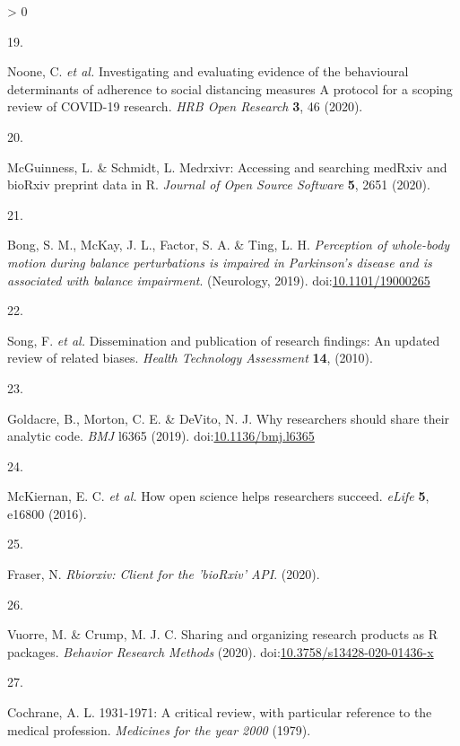 \documentclass[a4paper, twoside]{templates/ociamthesis}
\newlength{\cslhangindent}
\newlength{\csllabelwidth}
\newenvironment{CSLReferences}[3] %
 {%
  \setlength{\parindent}{0pt}
  \ifodd #1 \everypar{\setlength{\hangindent}{\cslhangindent}}\ignorespaces\fi
  \ifnum #2 > 0
  \setlength{\parskip}{#2\baselineskip}
  \fi
 }%
 {}
\newcommand{\CSLLeftMargin}[1]{\parbox[t]{\maxof{\widthof{#1}}{\csllabelwidth}}{#1}}
\newcommand{\CSLRightInline}[1]{\parbox[t]{\linewidth - \csllabelwidth}{#1}}
\begin{document}
\begin{CSLReferences}{0}{0}
\leavevmode\hypertarget{ref-noone2020}{}%
\CSLLeftMargin{19. }
\CSLRightInline{Noone, C. \emph{et al.} Investigating and evaluating evidence of the behavioural determinants of adherence to social distancing measures {} {A} protocol for a scoping review of {COVID}-19 research. \emph{HRB Open Research} \textbf{3}, 46 (2020).}

\leavevmode\hypertarget{ref-mcguinness2020a}{}%
\CSLLeftMargin{20. }
\CSLRightInline{McGuinness, L. \& Schmidt, L. Medrxivr: {Accessing} and searching {medRxiv} and {bioRxiv} preprint data in {R}. \emph{Journal of Open Source Software} \textbf{5}, 2651 (2020).}

\leavevmode\hypertarget{ref-bong2019}{}%
\CSLLeftMargin{21. }
\CSLRightInline{Bong, S. M., McKay, J. L., Factor, S. A. \& Ting, L. H. \emph{Perception of whole-body motion during balance perturbations is impaired in {Parkinson}'s disease and is associated with balance impairment}. ({Neurology}, 2019). doi:\href{https://doi.org/10.1101/19000265}{10.1101/19000265}}

\leavevmode\hypertarget{ref-song2010}{}%
\CSLLeftMargin{22. }
\CSLRightInline{Song, F. \emph{et al.} Dissemination and publication of research findings: An updated review of related biases. \emph{Health Technology Assessment} \textbf{14}, (2010).}

\leavevmode\hypertarget{ref-goldacre2019b}{}%
\CSLLeftMargin{23. }
\CSLRightInline{Goldacre, B., Morton, C. E. \& DeVito, N. J. Why researchers should share their analytic code. \emph{BMJ} l6365 (2019). doi:\href{https://doi.org/10.1136/bmj.l6365}{10.1136/bmj.l6365}}

\leavevmode\hypertarget{ref-mckiernan2016c}{}%
\CSLLeftMargin{24. }
\CSLRightInline{McKiernan, E. C. \emph{et al.} How open science helps researchers succeed. \emph{eLife} \textbf{5}, e16800 (2016).}

\leavevmode\hypertarget{ref-rbiorxiv}{}%
\CSLLeftMargin{25. }
\CSLRightInline{Fraser, N. \emph{Rbiorxiv: {Client} for the '{bioRxiv}' {API}}. (2020).}

\leavevmode\hypertarget{ref-vuorre2020}{}%
\CSLLeftMargin{26. }
\CSLRightInline{Vuorre, M. \& Crump, M. J. C. Sharing and organizing research products as {R} packages. \emph{Behavior Research Methods} (2020). doi:\href{https://doi.org/10.3758/s13428-020-01436-x}{10.3758/s13428-020-01436-x}}

\leavevmode\hypertarget{ref-cochrane20001931}{}%
\CSLLeftMargin{27. }
\CSLRightInline{Cochrane, A. L. 1931-1971: A critical review, with particular reference to the medical profession. \emph{Medicines for the year 2000} (1979).}


\end{CSLReferences}
\end{document}
